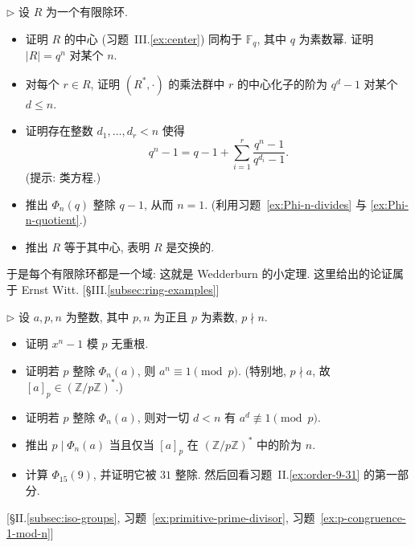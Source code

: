 \begin{prob}\label{ex:wedderburn-witt}
$\triangleright$ 设 $R$ 为一个有限除环.
\begin{itemize}
\item 证明 $R$ 的中心 (习题~III.\ref{ex:center}) 同构于 $\mathbb{F}_q$, 其中 $q$ 为素数幂. 证明 $|R|=q^n$ 对某个 $n$.
\item 对每个 $r\in R$, 证明 $(R^*,\cdot)$ 的乘法群中 $r$ 的中心化子的阶为 $q^d-1$ 对某个 $d\leq n$.
\item 证明存在整数 $d_1,\ldots,d_r<n$ 使得
\begin{equation}
q^n-1=q-1+\sum_{i=1}^r\frac{q^n-1}{q^{d_i}-1}.
\tag{*}\end{equation}
(提示: 类方程.)
\item 推出 $\Phi_n(q)$ 整除 $q-1$, 从而 $n=1$. (利用习题~\ref{ex:Phi-n-divides} 与 \ref{ex:Phi-n-quotient}.)
\item 推出 $R$ 等于其中心, 表明 $R$ 是交换的.
\end{itemize}
于是每个有限除环都是一个域: 这就是 Wedderburn 的小定理. 这里给出的论证属于 Ernst Witt. [§III.\ref{subsec:ring-examples}]
\end{prob}

\begin{prob}\label{ex:Phi-n-mod-p}
$\triangleright$ 设 $a,p,n$ 为整数, 其中 $p,n$ 为正且 $p$ 为素数, $p\nmid n$.
\begin{itemize}
\item 证明 $x^n-1$ 模 $p$ 无重根.
\item 证明若 $p$ 整除 $\Phi_n(a)$, 则 $a^n\equiv 1\pmod p$. (特别地, $p\nmid a$, 故 $[a]_p\in(\mathbb{Z}/p\mathbb{Z})^*$.)
\item 证明若 $p$ 整除 $\Phi_n(a)$, 则对一切 $d<n$ 有 $a^d\not\equiv 1\pmod p$.
\item 推出 $p\mid\Phi_n(a)$ 当且仅当 $[a]_p$ 在 $(\mathbb{Z}/p\mathbb{Z})^*$ 中的阶为 $n$.
\item 计算 $\Phi_{15}(9)$, 并证明它被 $31$ 整除. 然后回看习题~II.\ref{ex:order-9-31} 的第一部分.
\end{itemize}
[§II.\ref{subsec:iso-groups}, 习题~\ref{ex:primitive-prime-divisor}, 习题~\ref{ex:p-congruence-1-mod-n}]
\end{prob}

